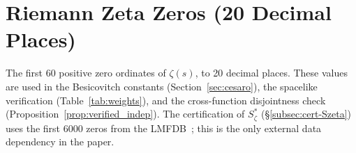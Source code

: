 \documentclass[12pt,reqno]{amsart}
\theoremstyle{plain}
\theoremstyle{definition}
\theoremstyle{remark}
\begin{document}

\section{Riemann Zeta Zeros (20 Decimal Places)}\label{app:zeta-zeros}

The first 60 positive zero ordinates of $\zeta(s)$, to 20 decimal places.  These values are used in the Besicovitch constants (Section~\ref{sec:cesaro}), the spacelike verification (Table~\ref{tab:weights}), and the cross-function disjointness check (Proposition~\ref{prop:verified_indep}).  The certification of $S_\zeta^*$ (\S\ref{subsec:cert-Szeta}) uses the first 6000 zeros from the LMFDB~\cite{LMFDB}; this is the only external data dependency in the paper.
\end{document}

